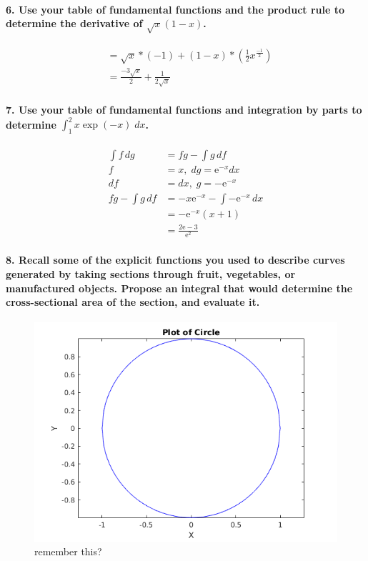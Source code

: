\documentclass{article}
\begin{document}
\paragraph{6. Use your table of fundamental functions and the product rule to determine the derivative of $\sqrt{x} (1-x)$.}

\begin{align*}
    &= \sqrt{x} * (-1) + (1 - x) * \left(\frac{1}{2}x^\frac{-1}{2}\right) \\
    &= \frac{-3\sqrt{x}}{2} + \frac{1}{2\sqrt{x}}
\end{align*}

\paragraph{7. Use your table of fundamental functions and integration by parts to determine $\int_1^2 x \exp(-x) \; dx$.}

\begin{align*}
    \int f\,dg &= fg - \int g \, df \\
    f &= x, \; dg = \mathrm{e}^{-x}dx \\
    df &= dx, \; g = -\mathrm{e}^{-x}\\
    fg - \int g \, df &= -x\mathrm{e}^{-x} - \int -\mathrm{e}^{-x} \, dx \\
    &= -\mathrm{e}^{-x}(x + 1) \\
    &= \frac{2\mathrm{e} - 3}{\mathrm{e}^2}
\end{align*}

\paragraph{8. Recall some of the explicit functions you used to describe curves generated by taking sections through fruit, vegetables, or manufactured objects. Propose an integral that would determine the cross-sectional area of the section, and evaluate it.}

\begin{figure}[H]
    \centering
    \includegraphics[width=0.5\columnwidth]{circle.png}
    \caption{remember this?}
\end{figure}
\end{document}
